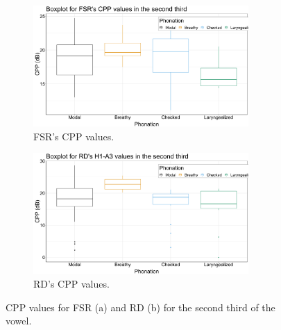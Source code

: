\documentclass[12pt, letterpaper]{article}
\begin{document}
\begin{figure}[!ht]
	\centering
	\begin{subfigure}{.5\textwidth}
		\centering
		\includegraphics[width=0.9\textwidth]{../mean_FSR_cpp_Second.png}
		\caption{FSR's CPP values.}
		\label{fig:FSRcppsecond} 
	\end{subfigure}%
	\begin{subfigure}{.5\textwidth}
		\centering
		\includegraphics[width=0.9\textwidth]{../mean_RD_cpp_Second.png}
		\caption{RD's CPP values.}
		\label{fig:RDcppsecond} 
	\end{subfigure}
	\caption{CPP values for FSR (a) and RD (b) for the second third of the vowel. }
	\label{fig:cppsecond}
\end{figure}
\end{document}
